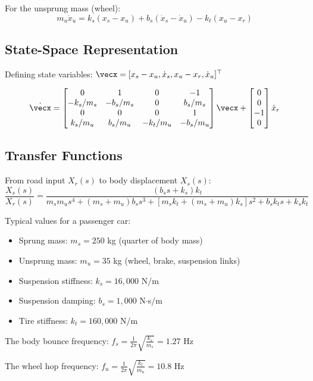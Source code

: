 For the unsprung mass (wheel):
\begin{equation}
m_u\ddot{x}_u = k_s(x_s - x_u) + b_s(\dot{x}_s - \dot{x}_u) - k_t(x_u - x_r)
\end{equation}

\subsection{State-Space Representation}

Defining state variables: $\vecx = [x_s - x_u, \dot{x}_s, x_u - x_r, \dot{x}_u]^\top$

\begin{equation}
\dot{\vecx} = \begin{bmatrix}
0 & 1 & 0 & -1 \\
-k_s/m_s & -b_s/m_s & 0 & b_s/m_s \\
0 & 0 & 0 & 1 \\
k_s/m_u & b_s/m_u & -k_t/m_u & -b_s/m_u
\end{bmatrix} \vecx + \begin{bmatrix} 0 \\ 0 \\ -1 \\ 0 \end{bmatrix} \dot{x}_r
\end{equation}

\subsection{Transfer Functions}

From road input $X_r(s)$ to body displacement $X_s(s)$:
\begin{equation}
\frac{X_s(s)}{X_r(s)} = \frac{(b_s s + k_s)k_t}{m_s m_u s^4 + (m_s + m_u)b_s s^3 + [m_s k_t + (m_s + m_u)k_s]s^2 + b_s k_t s + k_s k_t}
\end{equation}

\begin{examplebox}[title=Example 1.3: Quarter-Car Parameters]
Typical values for a passenger car:
\begin{itemize}
    \item Sprung mass: $m_s = 250$ kg (quarter of body mass)
    \item Unsprung mass: $m_u = 35$ kg (wheel, brake, suspension links)
    \item Suspension stiffness: $k_s = 16{,}000$ N/m
    \item Suspension damping: $b_s = 1{,}000$ N$\cdot$s/m
    \item Tire stiffness: $k_t = 160{,}000$ N/m
\end{itemize}

The body bounce frequency: $f_s = \frac{1}{2\pi}\sqrt{\frac{k_s}{m_s}} = 1.27$ Hz

The wheel hop frequency: $f_u = \frac{1}{2\pi}\sqrt{\frac{k_t}{m_u}} = 10.8$ Hz
\end{examplebox}

